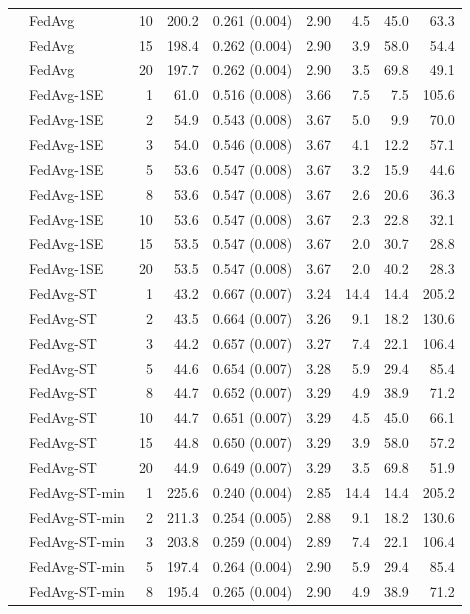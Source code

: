 \begin{longtable}{llrrrrrrr}
 & FedAvg & 10 & 200.2 & 0.261 (0.004) & 2.90 & 4.5 & 45.0 & 63.3 \\
 & FedAvg & 15 & 198.4 & 0.262 (0.004) & 2.90 & 3.9 & 58.0 & 54.4 \\
 & FedAvg & 20 & 197.7 & 0.262 (0.004) & 2.90 & 3.5 & 69.8 & 49.1 \\
 & FedAvg-1SE & 1 & 61.0 & 0.516 (0.008) & 3.66 & 7.5 & 7.5 & 105.6 \\
 & FedAvg-1SE & 2 & 54.9 & 0.543 (0.008) & 3.67 & 5.0 & 9.9 & 70.0 \\
 & FedAvg-1SE & 3 & 54.0 & 0.546 (0.008) & 3.67 & 4.1 & 12.2 & 57.1 \\
 & FedAvg-1SE & 5 & 53.6 & 0.547 (0.008) & 3.67 & 3.2 & 15.9 & 44.6 \\
 & FedAvg-1SE & 8 & 53.6 & 0.547 (0.008) & 3.67 & 2.6 & 20.6 & 36.3 \\
 & FedAvg-1SE & 10 & 53.6 & 0.547 (0.008) & 3.67 & 2.3 & 22.8 & 32.1 \\
 & FedAvg-1SE & 15 & 53.5 & 0.547 (0.008) & 3.67 & 2.0 & 30.7 & 28.8 \\
 & FedAvg-1SE & 20 & 53.5 & 0.547 (0.008) & 3.67 & 2.0 & 40.2 & 28.3 \\
 & FedAvg-ST & 1 & 43.2 & 0.667 (0.007) & 3.24 & 14.4 & 14.4 & 205.2 \\
 & FedAvg-ST & 2 & 43.5 & 0.664 (0.007) & 3.26 & 9.1 & 18.2 & 130.6 \\
 & FedAvg-ST & 3 & 44.2 & 0.657 (0.007) & 3.27 & 7.4 & 22.1 & 106.4 \\
 & FedAvg-ST & 5 & 44.6 & 0.654 (0.007) & 3.28 & 5.9 & 29.4 & 85.4 \\
 & FedAvg-ST & 8 & 44.7 & 0.652 (0.007) & 3.29 & 4.9 & 38.9 & 71.2 \\
 & FedAvg-ST & 10 & 44.7 & 0.651 (0.007) & 3.29 & 4.5 & 45.0 & 66.1 \\
 & FedAvg-ST & 15 & 44.8 & 0.650 (0.007) & 3.29 & 3.9 & 58.0 & 57.2 \\
 & FedAvg-ST & 20 & 44.9 & 0.649 (0.007) & 3.29 & 3.5 & 69.8 & 51.9 \\
 & FedAvg-ST-min & 1 & 225.6 & 0.240 (0.004) & 2.85 & 14.4 & 14.4 & 205.2 \\
 & FedAvg-ST-min & 2 & 211.3 & 0.254 (0.005) & 2.88 & 9.1 & 18.2 & 130.6 \\
 & FedAvg-ST-min & 3 & 203.8 & 0.259 (0.004) & 2.89 & 7.4 & 22.1 & 106.4 \\
 & FedAvg-ST-min & 5 & 197.4 & 0.264 (0.004) & 2.90 & 5.9 & 29.4 & 85.4 \\
 & FedAvg-ST-min & 8 & 195.4 & 0.265 (0.004) & 2.90 & 4.9 & 38.9 & 71.2 \\

\end{longtable}
